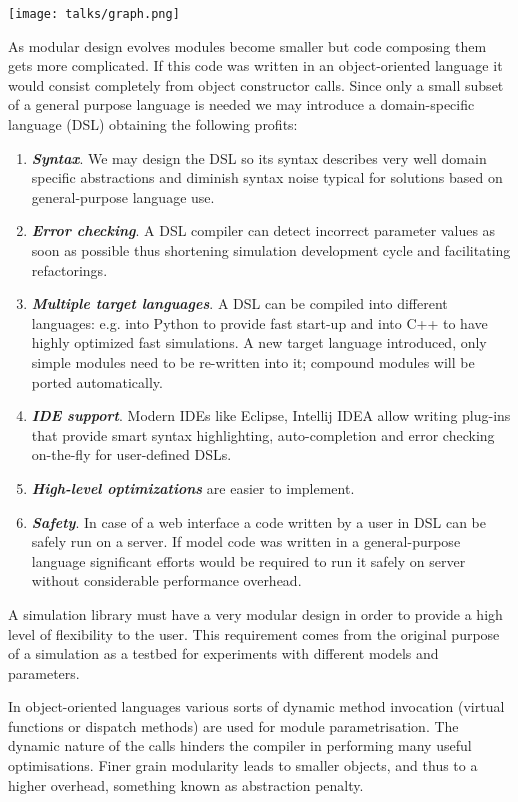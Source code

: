 \documentclass[a4paper,11pt]{article}
\begin{document}
\centerline{\texttt{[image: talks/graph.png]}}

As modular design evolves modules become smaller but code composing them gets more complicated. 
If this code was written in an object-oriented language it would consist completely from object constructor calls. Since only a small subset of a general purpose language is needed we may introduce a domain-specific language (DSL) obtaining the following profits:

\begin{enumerate}
\item \textbf{\textit{Syntax}}. We may design the DSL so its syntax describes very well domain specific abstractions and diminish syntax noise typical for solutions based on general-purpose language use.
\item \textbf{\textit{Error checking}}. A DSL compiler can detect incorrect parameter values as soon as possible thus shortening simulation development cycle and facilitating refactorings.
\item \textbf{\textit{Multiple target languages}}. A DSL can be compiled into different languages: e.g. into Python to provide fast start-up and into C++ to have highly optimized fast simulations. A new target language introduced, only simple modules need to be re-written into it; compound modules will be ported automatically.
  \item \textbf{\textit{IDE support}}. Modern IDEs like Eclipse, Intellij IDEA allow writing plug-ins that provide smart syntax highlighting, auto-completion and error checking on-the-fly for user-defined DSLs.
  \item \textbf{\textit{High-level optimizations}} are easier to implement. 
  \item \textbf{\textit{Safety}}. In case of a web interface a code written by a user in DSL can be safely run on a server. If model code was written in a general-purpose language significant efforts would be required to run it safely on server without considerable performance overhead.
\end{enumerate}

A simulation library must have a very modular design in order to provide a high level of flexibility to the user. This requirement comes from the original purpose of a simulation as a testbed for experiments with different models and parameters.

In object-oriented languages various sorts of dynamic method invocation (virtual functions or dispatch methods) are used for module parametrisation. The dynamic nature of the calls hinders the compiler in performing many useful optimisations. Finer grain modularity leads to smaller objects, and thus to a higher overhead, something known as abstraction penalty.
\end{document}

